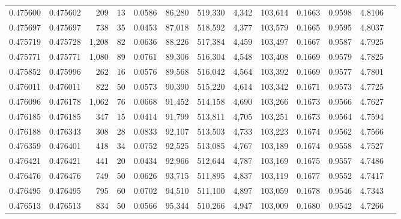 \begin{tabular}{rrrrrrrrrrrrr}
0.475600 & 0.475602 &   209 &    13 &                                     0.0586 &  86,280 & 519,330 &   4,342 & 103,614 & 0.1663 & 0.9598 & 4.8106 \\
0.475697 & 0.475697 &   738 &    35 &                                     0.0453 &  87,018 & 518,592 &   4,377 & 103,579 & 0.1665 & 0.9595 & 4.8037 \\
0.475719 & 0.475728 & 1,208 &    82 &                                     0.0636 &  88,226 & 517,384 &   4,459 & 103,497 & 0.1667 & 0.9587 & 4.7925 \\
0.475771 & 0.475771 & 1,080 &    89 &                                     0.0761 &  89,306 & 516,304 &   4,548 & 103,408 & 0.1669 & 0.9579 & 4.7825 \\
0.475852 & 0.475996 &   262 &    16 &                                     0.0576 &  89,568 & 516,042 &   4,564 & 103,392 & 0.1669 & 0.9577 & 4.7801 \\
0.476011 & 0.476011 &   822 &    50 &                                     0.0573 &  90,390 & 515,220 &   4,614 & 103,342 & 0.1671 & 0.9573 & 4.7725 \\
0.476096 & 0.476178 & 1,062 &    76 &                                     0.0668 &  91,452 & 514,158 &   4,690 & 103,266 & 0.1673 & 0.9566 & 4.7627 \\
0.476185 & 0.476185 &   347 &    15 &                                     0.0414 &  91,799 & 513,811 &   4,705 & 103,251 & 0.1673 & 0.9564 & 4.7594 \\
0.476188 & 0.476343 &   308 &    28 &                                     0.0833 &  92,107 & 513,503 &   4,733 & 103,223 & 0.1674 & 0.9562 & 4.7566 \\
0.476359 & 0.476401 &   418 &    34 &                                     0.0752 &  92,525 & 513,085 &   4,767 & 103,189 & 0.1674 & 0.9558 & 4.7527 \\
0.476421 & 0.476421 &   441 &    20 &                                     0.0434 &  92,966 & 512,644 &   4,787 & 103,169 & 0.1675 & 0.9557 & 4.7486 \\
0.476476 & 0.476476 &   749 &    50 &                                     0.0626 &  93,715 & 511,895 &   4,837 & 103,119 & 0.1677 & 0.9552 & 4.7417 \\
0.476495 & 0.476495 &   795 &    60 &                                     0.0702 &  94,510 & 511,100 &   4,897 & 103,059 & 0.1678 & 0.9546 & 4.7343 \\
0.476513 & 0.476513 &   834 &    50 &                                     0.0566 &  95,344 & 510,266 &   4,947 & 103,009 & 0.1680 & 0.9542 & 4.7266 \\

\end{tabular}
